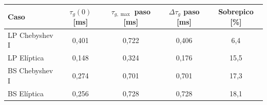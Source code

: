 \begin{tabular}{@{}lcccc@{}}
\toprule
Caso & $\tau_g(0)$ [ms] & $\tau_{g,\max}$ paso [ms] & $\Delta\tau_g$ paso [ms] & Sobrepico [\%] \\
\midrule
LP Chebyshev I & 0{,}401 & 0{,}722 & 0{,}406 & 6{,}4 \\
LP Elíptica & 0{,}148 & 0{,}324 & 0{,}176 & 15{,}5 \\
BS Chebyshev I & 0{,}274 & 0{,}701 & 0{,}701 & 17{,}3 \\
BS Elíptica & 0{,}256 & 0{,}728 & 0{,}728 & 18{,}1 \\
\bottomrule
\end{tabular}